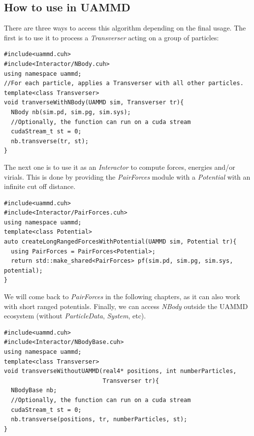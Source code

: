 \documentclass[ twoside,openright,titlepage,numbers=noenddot,%
headinclude,footinclude,cleardoublepage=empty,abstract=on,
BCOR=5mm,paper=a4,fontsize=11pt, dvipsnames
]{scrreprt}
\newcommand{\uammd}{\gls{UAMMD}\xspace}
\begin{document}
\subsection{How to use in UAMMD}
There are three ways to access this algorithm depending on the final usage.
The first is to use it to process a \emph{Transverser} acting on a group of particles:
\begin{verbatim}
#include<uammd.cuh>
#include<Interactor/NBody.cuh>
using namespace uammd;
//For each particle, applies a Transverser with all other particles.
template<class Transverser>
void tranverseWithNBody(UAMMD sim, Transverser tr){
  NBody nb(sim.pd, sim.pg, sim.sys);
  //Optionally, the function can run on a cuda stream
  cudaStream_t st = 0;
  nb.transverse(tr, st);
}
\end{verbatim}
The next one is to use it as an \emph{Interactor} to compute forces, energies and/or virials. This is done by providing the \emph{PairForces} module with a \emph{Potential} with an infinite cut off distance.
\begin{verbatim}
#include<uammd.cuh>
#include<Interactor/PairForces.cuh>
using namespace uammd;
template<class Potential>
auto createLongRangedForcesWithPotential(UAMMD sim, Potential tr){
  using PairForces = PairForces<Potential>;
  return std::make_shared<PairForces> pf(sim.pd, sim.pg, sim.sys, potential);
}
\end{verbatim}
We will come back to \emph{PairForces} in the following chapters, as it can also work with short ranged potentials.
Finally, we can access \emph{NBody} outside the \uammd ecosystem (without \emph{ParticleData}, \emph{System}, etc).
\begin{verbatim}
#include<uammd.cuh>
#include<Interactor/NBodyBase.cuh>
using namespace uammd;
template<class Transverser>
void transverseWithoutUAMMD(real4* positions, int numberParticles,
                            Transverser tr){
  NBodyBase nb;
  //Optionally, the function can run on a cuda stream
  cudaStream_t st = 0;
  nb.transverse(positions, tr, numberParticles, st);
}
\end{verbatim}
\end{document}
